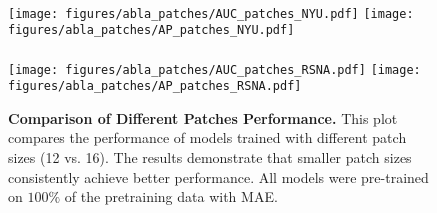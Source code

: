 \begin{figure}[!htpb]
    \centering
     \\[0.2cm]
    \texttt{[image: figures/abla\_patches/AUC\_patches\_NYU.pdf]}
    \texttt{[image: figures/abla\_patches/AP\_patches\_NYU.pdf]}\\
     \\[0.2cm]
    \texttt{[image: figures/abla\_patches/AUC\_patches\_RSNA.pdf]}
    \texttt{[image: figures/abla\_patches/AP\_patches\_RSNA.pdf]} 
    \caption{\textbf{Comparison of Different Patches Performance.} This plot compares the performance of models trained with different patch sizes (12 vs. 16). The results demonstrate that smaller patch sizes consistently achieve better performance. All models were pre-trained on $100\%$ of the pretraining data with MAE.}
    \label{fig:patches-ablation}
\end{figure}
